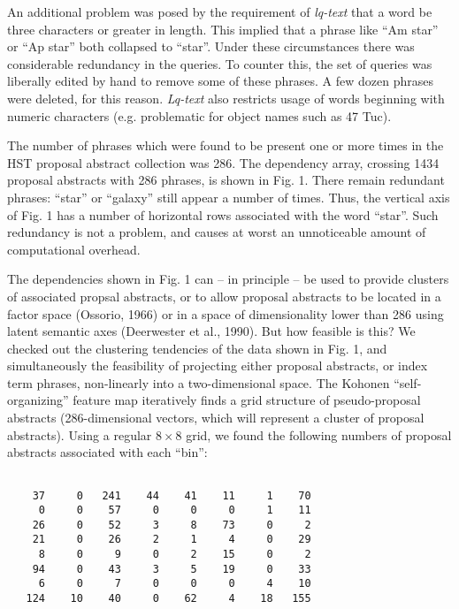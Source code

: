 An additional problem was posed by the requirement of {\it lq-text}
that a word be three characters or greater in length.  This implied that
a phrase like ``Am star'' or ``Ap star'' both collapsed to 
``star''.  Under these
circumstances there was considerable redundancy in the queries.  To counter
this, the set of queries was liberally edited by hand to remove some of 
these phrases.  A few dozen phrases were deleted, for this reason.  
{\it Lq-text} also restricts usage of words beginning with numeric
characters (e.g. problematic for object names such as 47 Tuc).

The number of phrases which were found to be present one or more times in
the HST proposal abstract collection was 286.  The dependency array, crossing
1434 proposal abstracts with 286 phrases, is shown in Fig. 1.  There remain
redundant phrases: ``star'' or ``galaxy'' still appear a number of times.  
Thus, the vertical axis of Fig. 1 has a number of horizontal rows associated
with the word ``star''.  Such redundancy is not a problem, and causes at
worst an unnoticeable amount of computational overhead. 

The dependencies shown in Fig. 1 can -- in principle -- be used to provide
clusters of associated propsal abstracts, or to allow proposal abstracts to 
be located in a factor space (Ossorio, 1966) or in a space of dimensionality 
lower than 286 using latent semantic axes (Deerwester et al., 1990).  But
how feasible is this?  We checked out the clustering tendencies of the 
data shown in Fig. 1, and simultaneously the feasibility of projecting either
proposal abstracts, or index term phrases, non-linearly into a two-dimensional
space.  The Kohonen ``self-organizing'' feature map iteratively finds a 
grid structure of pseudo-proposal abstracts (286-dimensional vectors, which
will represent a cluster of proposal abstracts).  Using a regular $8 \times 8$ 
grid, we found the following numbers of proposal abstracts associated 
with each 
``bin'':

\begin{verbatim}

    37     0   241    44    41    11     1    70
     0     0    57     0     0     0     1    11
    26     0    52     3     8    73     0     2
    21     0    26     2     1     4     0    29
     8     0     9     0     2    15     0     2
    94     0    43     3     5    19     0    33
     6     0     7     0     0     0     4    10
   124    10    40     0    62     4    18   155

\end{verbatim}

